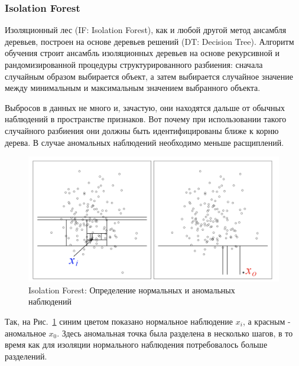 \documentclass[12pt]{article}
\begin{document}
    \subsubsection{Isolation Forest}
    \label{sec:Research:Model:IsolationForest}

    \par Изоляционный лес (IF: Isolation Forest), как и любой другой метод ансамбля деревьев, построен на основе деревьев решений (DT: Decision Tree). Алгоритм обучения строит ансамбль изоляционных деревьев на основе рекурсивной и рандомизированной процедуры структурированного разбиения: сначала случайным образом выбирается объект, а затем выбирается случайное значение между минимальным и максимальным значением выбранного объекта. \\

    \par Выбросов в данных не много и, зачастую, они находятся дальше от обычных наблюдений в пространстве признаков. Вот почему при использовании такого случайного разбиения они должны быть идентифицированы ближе к корню дерева. В случае аномальных наблюдений необходимо меньше расщиплений. \\

    \begin{figure}[h]
        \centering
        \includegraphics[width=0.8\linewidth]{IsolationForest.png}
        \caption{Isolation Forest: Определение нормальных и аномальных наблюдений}
        \label{sec:Research:Model:IsolationForest:fig:IsolationForest}
    \end{figure}
    
    \par Так, на Рис.~\ref{sec:Research:Model:IsolationForest:fig:IsolationForest} синим цветом показано нормальное наблюдение $x_i$, а красным - аномальное $x_0$. Здесь аномальная точка была разделена в несколько шагов, в то время как для изоляции нормального наблюдения потребовалось больше разделений.\\
    
\end{document}
